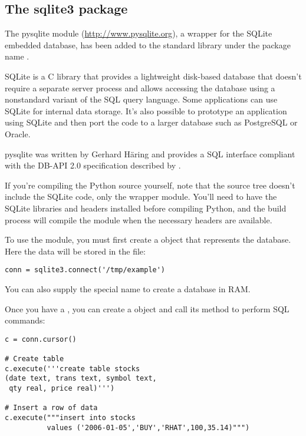 \documentclass{howto}
\begin{document}
\subsection{The sqlite3 package\label{module-sqlite}}

The pysqlite module (\url{http://www.pysqlite.org}), a wrapper for the
SQLite embedded database, has been added to the standard library under
the package name .  

SQLite is a C library that provides a lightweight disk-based database
that doesn't require a separate server process and allows accessing
the database using a nonstandard variant of the SQL query language.
Some applications can use SQLite for internal data storage.  It's also
possible to prototype an application using SQLite and then port the
code to a larger database such as PostgreSQL or Oracle.
 
pysqlite was written by Gerhard H\"aring and provides a SQL interface
compliant with the DB-API 2.0 specification described by
. 

If you're compiling the Python source yourself, note that the source
tree doesn't include the SQLite code, only the wrapper module.
You'll need to have the SQLite libraries and headers installed before
compiling Python, and the build process will compile the module when
the necessary headers are available.

To use the module, you must first create a  object
that represents the database.  Here the data will be stored in the 
 file:

\begin{verbatim}
conn = sqlite3.connect('/tmp/example')
\end{verbatim}

You can also supply the special name  to create
a database in RAM.

Once you have a , you can create a  
object and call its  method to perform SQL commands:

\begin{verbatim}
c = conn.cursor()

# Create table
c.execute('''create table stocks
(date text, trans text, symbol text,
 qty real, price real)''')

# Insert a row of data
c.execute("""insert into stocks
          values ('2006-01-05','BUY','RHAT',100,35.14)""")
\end{verbatim}    
\end{document}
